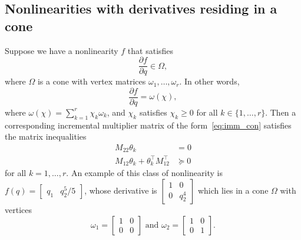 \documentclass[times, doublespace]{rncauth}
\begin{document}
\subsection{Nonlinearities with derivatives residing in a cone}
Suppose we have a nonlinearity $f$ that satisfies
\[
\frac{\partial f}{\partial q} \in \Omega,
\]
where $\Omega$ is a cone with vertex matrices $\omega_1,\ldots,\omega_r$. In other words, 
\[
\frac{\partial f}{\partial q} = \omega(\chi),
\]
where $\omega(\chi) = \sum_{k=1}^r \chi_k \omega_k$, and $\chi_k$ satisfies $\chi_k\ge 0$ for all $k\in\{1,\ldots, r\}$. Then a corresponding incremental multiplier matrix of the form~\eqref{eq:imm_con} satisfies the matrix inequalities
\begin{align*}
M_{22}\theta_k &= 0\\
M_{12}\theta_k + \theta_k^\top M_{12}^\top &\succeq 0
\end{align*}
for all $k=1,\ldots, r$. An example of this class of nonlinearity is $f(q) = \begin{bmatrix}
q_1 & q_2^5/5
\end{bmatrix}$, whose derivative is $\begin{bmatrix}
1 & 0 \\ 0 & q_2^4
\end{bmatrix}$ which lies in a cone $\Omega$ with vertices
\[
\omega_1 = \begin{bmatrix}
1 & 0 \\ 0 & 0
\end{bmatrix} \text{ and }
\omega_2 = \begin{bmatrix}
1 & 0 \\ 0 & 1
\end{bmatrix}.
\]
\end{document}
